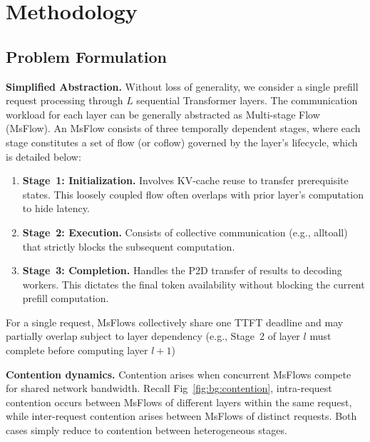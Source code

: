 \section{Methodology}\label{sec:Methodology}

\subsection{Problem Formulation}\label{sec:Methodology:formulation}

\textbf{Simplified Abstraction.} Without loss of generality, we consider a single prefill request processing through $L$ sequential Transformer layers. The communication workload for each layer can be generally abstracted as Multi-stage Flow (MsFlow). An MsFlow consists of three temporally dependent stages, where each stage constitutes a set of flow (or coflow) governed by the layer's lifecycle, which is detailed below:
\begin{enumerate}[label=$\bullet$,leftmargin=*,itemsep=0.5pt]
\item \textbf{Stage~1: Initialization.} Involves KV-cache reuse to transfer prerequisite states. This loosely coupled flow often overlaps with prior layer's computation to hide latency.
\item \textbf{Stage~2: Execution.} Consists of collective communication (e.g., alltoall) that strictly blocks the subsequent computation.
\item \textbf{Stage~3: Completion.} Handles the P2D transfer of results to decoding workers. This dictates the final token availability without blocking the current prefill computation.
\end{enumerate}

For a single request, MsFlows collectively share one TTFT deadline and may partially overlap subject to layer dependency (e.g., Stage~2 of layer $l$ must complete before computing layer $l+1$)

\textbf{Contention dynamics.} Contention arises when concurrent MsFlows compete for shared network bandwidth. Recall Fig~\ref{fig:bg:contention}, intra-request contention occurs between MsFlows of different layers within the same request, while inter-request contention arises between MsFlows of distinct requests. Both cases simply reduce to contention between heterogeneous stages.

